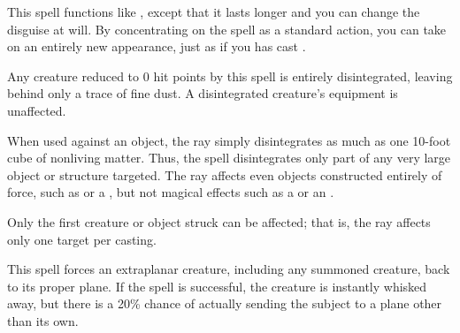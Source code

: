 \begin{spelleffect}
  This spell functions like , except that it lasts longer and you can change the disguise at will. By concentrating on the spell as a standard action, you can take on an entirely new appearance, just as if you has cast . 
\end{spelleffect}

\spellrng{\rngclose}
\begin{spelleffect}
  Any creature reduced to 0 hit points by this spell is entirely disintegrated, leaving behind only a trace of fine dust. A disintegrated creature's equipment is unaffected.
  \par When used against an object, the ray simply disintegrates as much as one 10-foot cube of nonliving matter. Thus, the spell disintegrates only part of any very large object or structure targeted. The ray affects even objects constructed entirely of force, such as  or a , but not magical effects such as a  or an .
\end{spelleffect}
\begin{spellnotes}
  Only the first creature or object struck can be affected; that is, the ray affects only one target per casting.
\end{spellnotes}

\spellrng{\rngclose}
\begin{spelleffect}
  This spell forces an extraplanar creature, including any summoned creature, back to its proper plane. If the spell is successful, the creature is instantly whisked away, but there is a 20\% chance of actually sending the subject to a plane other than its own.
\end{spelleffect}

